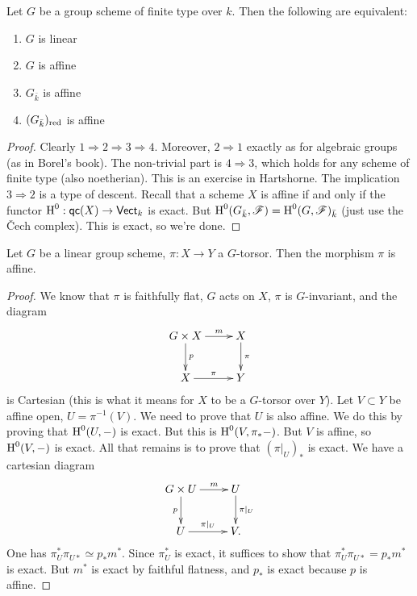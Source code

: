 \documentclass{article}
\begin{document}
\begin{lemma}
Let $G$ be a group scheme of finite type over $k$. Then the following are 
equivalent:
\begin{enumerate}
  \item $G$ is linear
  \item $G$ is affine 
  \item $G_{\bar k}$ is affine
  \item $(G_{\bar k})_{\mathrm{red}}$ is affine
\end{enumerate}
\end{lemma}
\begin{proof}
Clearly $1 \Rightarrow 2 \Rightarrow3\Rightarrow 4$. Moreover, 
$2\Rightarrow 1$ exactly as for algebraic groups (as in Borel's book). The 
non-trivial part is $4\Rightarrow 3$, which holds for any scheme of finite 
type (also noetherian). This is an exercise in Hartshorne. The implication 
$3\Rightarrow 2$ is a type of descent. Recall that a scheme $X$ is affine if 
and only if the functor $\operatorname{H}^0:\mathsf{qc}(X) \to \mathsf{Vect}_k$ is 
exact. But $\operatorname{H}^0(G_{\bar k},\mathscr{F}) = \operatorname{H}^0(G,\mathscr{F})_{\bar k}$ (just use the 
\v Cech complex). This is exact, so we're done. 
\end{proof}

\begin{lemma}
Let $G$ be a linear group scheme, $\pi:X\to Y$ a $G$-torsor. Then the morphism 
$\pi$ is affine. 
\end{lemma}
\begin{proof}
We know that $\pi$ is faithfully flat, $G$ acts on $X$, $\pi$ is $G$-invariant, 
and the diagram 
\[\xymatrix{
  G\times X \ar[r]^-m \ar[d]^-p 
    & X \ar[d]^-\pi \\
  X \ar[r]^-\pi 
    & Y
}\]
is Cartesian (this is what it means for $X$ to be a $G$-torsor over $Y$). 
Let $V\subset Y$ be affine open, $U=\pi^{-1}(V)$. We need to prove that 
$U$ is also affine. We do this by proving that $\operatorname{H}^0(U,-)$ is exact. But 
this is $\operatorname{H}^0(V,\pi_\ast -)$. But $V$ is affine, so $\operatorname{H}^0(V,-)$ is 
exact. All that remains is to prove that $(\pi|_U)_\ast$ is exact. We have a 
cartesian diagram 
\[\xymatrix{
  G\times U \ar[r]^-m \ar[d]_p 
    & U \ar[d]^-{\pi|_U} \\ 
  U \ar[r]^-{\pi|_U} 
    & V .
}\]
One has $\pi_U^\ast \pi_{U\ast} \simeq p_\ast m^\ast$. Since 
$\pi_U^\ast$ is exact, it suffices to show that 
$\pi_U^\ast \pi_{U\ast} = p_\ast m^\ast$ is exact. But $m^\ast$ is exact by 
faithful flatness, and $p_\ast$ is exact because $p$ is affine. 
\end{proof}
\end{document}
